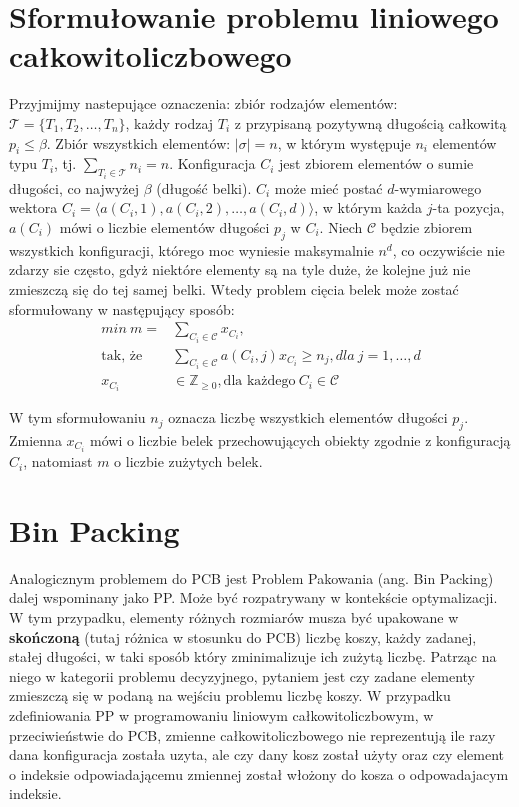 \section{Sformułowanie problemu liniowego całkowitoliczbowego} \label{linear_formula}
Przyjmijmy nastepujące oznaczenia: zbiór rodzajów elementów: $\mathcal{T} = \{T_1, T_2, \dots, T_n\}$, każdy rodzaj $T_i$ z przypisaną pozytywną długością całkowitą $p_i \leq \beta$. Zbiór wszystkich elementów: $|\mathcal{\sigma}| = n$, w którym występuje $n_i$ elementów typu $T_i$, tj. $\sum_{T_i \in \mathcal{T}} n_i = n$.
Konfiguracja $C_i$ jest zbiorem elementów o sumie długości, co najwyżej $\beta$ (długość belki). $C_i$ może mieć postać $d$-wymiarowego wektora $C_i = \langle a(C_i, 1), a(C_i,2), \dots, a(C_i,d)\rangle$, w którym każda $j$-ta pozycja, $a(C_i)$ mówi o liczbie elementów długości $p_j$ w $C_i$. Niech $\mathcal{C}$ będzie zbiorem wszystkich konfiguracji, którego moc wyniesie maksymalnie $n^d$, co oczywiście nie zdarzy sie często, gdyż niektóre elementy są na tyle duże, że kolejne już nie zmieszczą się do tej samej belki.
Wtedy problem cięcia belek może zostać sformułowany w następujący sposób:
\begin{align}
	min \ m =&\sum_{C_i \in \mathcal{C}} x_{C_i}, \\
	\text{tak, że} &\sum_{C_i \in \mathcal{C}} a(C_i,j)x_{C_i} \geq n_j, dla \ j = 1, \dots, d \\
	x_{C_i} &\in \mathbb{Z}_{\geq 0}, \text{dla każdego} \ C_i \in \mathcal{C} 
\end{align}

W tym sformułowaniu $n_j$ oznacza liczbę wszystkich elementów długości $p_j$. Zmienna $x_{C_i}$ mówi o liczbie belek przechowujących obiekty zgodnie z konfiguracją $C_i$, natomiast $m$ o liczbie zużytych belek.

\section{Bin Packing}
Analogicznym problemem do PCB jest Problem Pakowania (ang. Bin Packing) dalej wspominany jako PP.
Może być rozpatrywany w kontekście optymalizacji. W tym przypadku, elementy różnych rozmiarów musza być upakowane w \textbf{skończoną} (tutaj różnica w stosunku do PCB) liczbę koszy, każdy zadanej, stałej długości, w taki sposób który zminimalizuje ich zużytą liczbę. Patrząc na niego w kategorii problemu decyzyjnego, pytaniem jest czy zadane elementy zmieszczą się w podaną na wejściu problemu liczbę koszy.
W przypadku zdefiniowania PP w programowaniu liniowym całkowitoliczbowym, w przeciwieństwie do PCB, zmienne całkowitoliczbowego nie reprezentują ile razy dana konfiguracja została uzyta, ale czy dany kosz został użyty oraz czy element o indeksie odpowiadającemu zmiennej został włożony do kosza o odpowadajacym indeksie.

